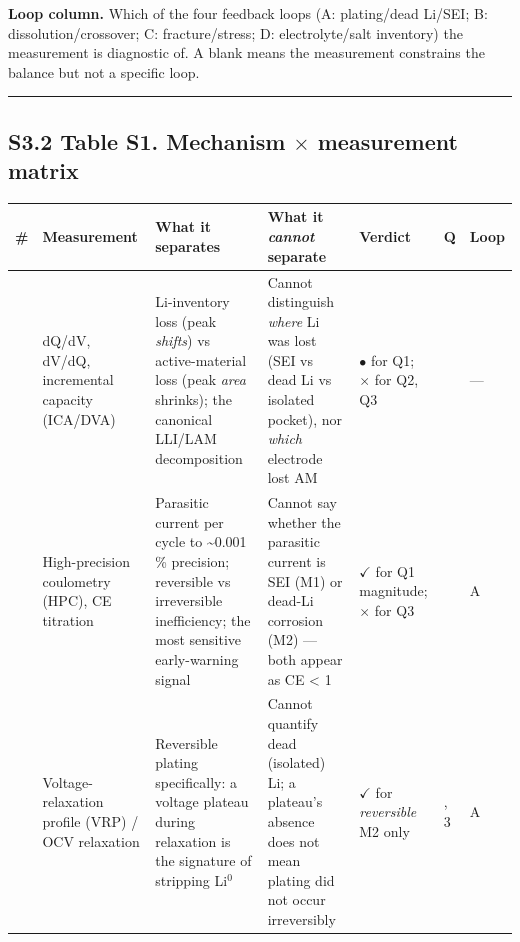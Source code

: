 \documentclass[11pt,a4paper]{article}
\renewcommand{\arraystretch}{1.15}
\begin{document}
\textbf{Loop column.} Which of the four feedback loops (A: plating/dead Li/SEI; B: dissolution/crossover; C: fracture/stress; D: electrolyte/salt inventory) the measurement is diagnostic of. A blank means the measurement constrains the balance but not a specific loop.


\par\noindent\rule{\linewidth}{0.4pt}\par


\subsection*{S3.2 Table S1. Mechanism \ensuremath{\times} measurement matrix}


\begingroup\scriptsize
\setlength{\tabcolsep}{3pt}
\renewcommand{\arraystretch}{1.12}
\sloppy
\begin{longtable}{@{}>{\raggedright\arraybackslash}p{}>{\raggedright\arraybackslash}p{}>{\raggedright\arraybackslash}p{}>{\raggedright\arraybackslash}p{}>{\raggedright\arraybackslash}p{}>{\raggedright\arraybackslash}p{}>{\raggedright\arraybackslash}p{}@{}}
\hline
\textbf{\#} & \textbf{Measurement} & \textbf{What it separates} & \textbf{What it \emph{cannot} separate} & \textbf{Verdict} & \textbf{Q} & \textbf{Loop} \\ \hline
\endhead
1 & dQ/dV, dV/dQ, incremental capacity (ICA/DVA) & Li-inventory loss (peak \emph{shifts}) vs active-material loss (peak \emph{area} shrinks); the canonical LLI/LAM decomposition & Cannot distinguish \emph{where} Li was lost (SEI vs dead Li vs isolated pocket), nor \emph{which} electrode lost AM & \ensuremath{\bullet} for Q1; \ensuremath{\boldsymbol{\times}} for Q2, Q3 & 1 & --- \\
2 & High-precision coulometry (HPC), CE titration & Parasitic current per cycle to \textasciitilde{}0.001 \% precision; reversible vs irreversible inefficiency; the most sensitive early-warning signal & Cannot say whether the parasitic current is SEI (M1) or dead-Li corrosion (M2) --- both appear as CE < 1 & \ensuremath{\checkmark} for Q1 magnitude; \ensuremath{\boldsymbol{\times}} for Q3 & 1 & A \\
3 & Voltage-relaxation profile (VRP) / OCV relaxation & Reversible plating specifically: a voltage plateau during relaxation is the signature of stripping Li\ensuremath{^{0}} & Cannot quantify dead (isolated) Li; a plateau's absence does not mean plating did not occur irreversibly & \ensuremath{\checkmark} for \emph{reversible} M2 only & 1, 3 & A \\

\end{longtable}
\end{document}
